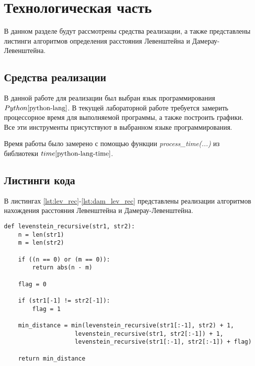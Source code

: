 \chapter{Технологическая часть}

В данном разделе будут рассмотрены средства реализации, а также представлены листинги алгоритмов определения расстояния Левенштейна и Дамерау-Левенштейна.

\section{Средства реализации}
В данной работе для реализации был выбран язык программирования $Python \cite{python-lang}$. В текущей лабораторной работе требуется замерить процессорное время для выполняемой программы, а также построить графики. Все эти инструменты присутствуют в выбранном языке программирования.

Время работы было замерено с помощью функции \textit{process\_time(...)} из библиотеки $time \cite{python-lang-time}$.


\section{Листинги кода}

В листингах \ref{lst:lev_rec}-\ref{lst:dam_lev_rec} представлены реализации алгоритмов нахождения расстояния Левенштейна и Дамерау-Левенштейна.

\clearpage

\begin{center}
    \captionsetup{justification=raggedright,singlelinecheck=off}
    \begin{lstlisting}[label=lst:lev_rec,caption=Алгоритм нахождения расстояния Левенштейна (рекурсивный)]
def levenstein_recursive(str1, str2):
    n = len(str1)
    m = len(str2)

    if ((n == 0) or (m == 0)):
        return abs(n - m)

    flag = 0

    if (str1[-1] != str2[-1]):
        flag = 1

    min_distance = min(levenstein_recursive(str1[:-1], str2) + 1,
                    levenstein_recursive(str1, str2[:-1]) + 1,
                    levenstein_recursive(str1[:-1], str2[:-1]) + flag)

    return min_distance
\end{lstlisting}
\end{center}


